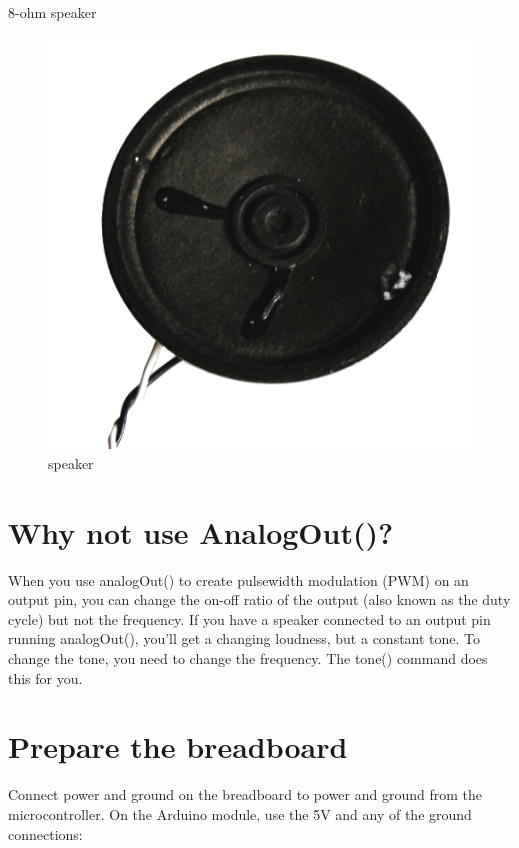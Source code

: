 8-ohm speaker


\begin{figure}[!htb]
 \centering
 \includegraphics[scale=0.15]{img/toneout/speaker.png}
 \caption{speaker}
 \label{speaker}
\end{figure}


\section{Why not use AnalogOut()?}

When you use analogOut() to create pulsewidth modulation (PWM) on an output pin, you can change the on-off ratio of the output (also known as the duty cycle) but not the frequency. If you have a speaker connected to an output pin running analogOut(), you'll get a changing loudness, but a constant tone. To change the tone, you need to change the frequency. The tone() command does this for you.

\section{Prepare the breadboard}

Connect power and ground on the breadboard to power and ground from the microcontroller. On the Arduino module, use the 5V and any of the ground connections:

